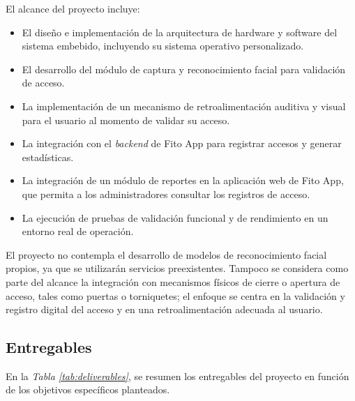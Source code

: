 El alcance del proyecto incluye:
\begin{itemize}
    \item El diseño e implementación de la arquitectura de hardware y software del sistema embebido, incluyendo su sistema operativo personalizado.
    \item El desarrollo del módulo de captura y reconocimiento facial para validación de acceso.
    \item La implementación de un mecanismo de retroalimentación auditiva y visual para el usuario al momento de validar su acceso.
    \item La integración con el \textit{backend} de Fito App para registrar accesos y generar estadísticas.
    \item La integración de un módulo de reportes en la aplicación web de Fito App, que permita a los administradores consultar los registros de acceso.
    \item La ejecución de pruebas de validación funcional y de rendimiento en un entorno real de operación.
\end{itemize}

El proyecto no contempla el desarrollo de modelos de reconocimiento facial propios, ya que se utilizarán servicios preexistentes. Tampoco se considera como parte del alcance la integración con mecanismos físicos de cierre o apertura de acceso, tales como puertas o torniquetes; el enfoque se centra en la validación y registro digital del acceso y en una retroalimentación adecuada al usuario.

\subsection{Entregables}
En la \textit{Tabla \ref{tab:deliverables}}, se resumen los entregables del proyecto en función de los objetivos específicos planteados.

\newcommand{\deliverablearch}{Documento de arquitectura}
\newcommand{\deliverabledet}{Unidad de interacción y detección facial}
\newcommand{\deliverableos}{Imagen de sistema operativo para nodo embebido}
\newcommand{\deliverablerec}{Servicio de reconocimiento facial y autorización}
\newcommand{\deliverablerep}{Módulo de reportes}
\newcommand{\deliverableperf}{Informe de pruebas de rendimiento}

